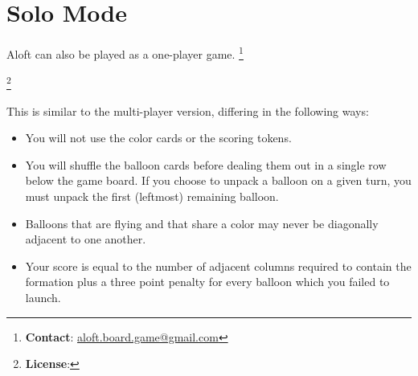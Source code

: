 \documentclass[a6paper, 11pt, parskip=half, DIV=15]{scrartcl}
\newcommand\blfootnote[1]{%
  \begingroup
  \renewcommand\thefootnote{}\footnote{#1}%
  \addtocounter{footnote}{-1}%
  \endgroup
}
\renewcommand{\thefootnote}{\fnsymbol{footnote}}
\begin{document}
\section*{Solo Mode}
Aloft can also be played as a one-player game.
\blfootnote{\textbf{Contact}: \href{mailto:aloft.board.game@gmail.com}{aloft.board.game@gmail.com}}
\blfootnote{\textbf{License}: \raggedright\doclicenseLongText}
This is similar to the multi-player version, differing in the following ways:
\begin{itemize}
  \item You will not use the color cards or the scoring tokens.%
  \item You will shuffle the balloon cards before dealing them out in a single row below the game board. If you choose to unpack a balloon on a given turn, you must unpack the first (leftmost) remaining balloon.
  \item Balloons that are flying and that share a color may never be diagonally adjacent to one another.
  \item Your score is equal to the number of adjacent columns required to contain the formation plus a three point penalty for every balloon which you failed to launch.
\end{itemize}
 \newpage
\phantom{Aloft}
%
\end{document}
